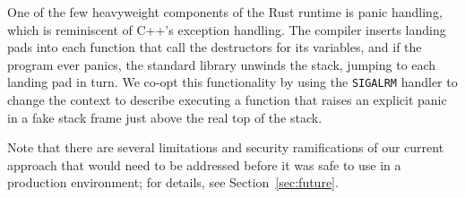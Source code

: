 One of the few heavyweight components of the Rust runtime is panic handling, which is
reminiscent of C++'s exception handling.  The compiler inserts landing pads into each
function that call the destructors for its variables, and if the program ever panics,
the standard library unwinds the stack, jumping to each landing pad in turn.  We
co-opt this functionality by using the \texttt{SIGALRM} handler to change the context
to describe executing a function that raises an explicit panic in a fake stack frame
just above the real top of the stack.

Note that there are several limitations and security ramifications of our current
approach that would need to be addressed before it was safe to use in a production
environment; for details, see Section~\ref{sec:future}.
